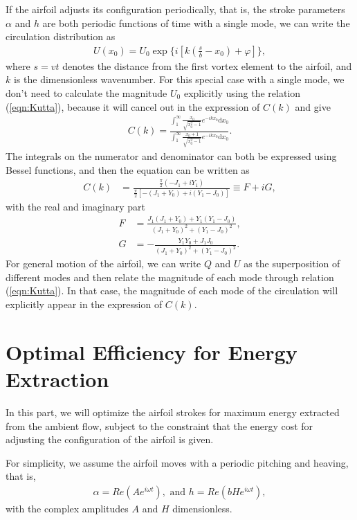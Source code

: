 If the airfoil adjusts its configuration periodically, that is, the stroke parameters $\alpha$ and $h$ are both periodic functions of time with a single mode, we can write the circulation distribution as
\begin{align}
U(x_0) = U_0 \exp \{i[k(\frac{s}{b}-x_0)+ \varphi] \},
\end{align}
where $s = vt$ denotes the distance from the first vortex element to the airfoil, and $k$ is the dimensionless wavenumber.
For this special case with a single mode, we don't need to calculate the magnitude $U_0$ explicitly using the relation (\ref{eqn:Kutta}), because it will cancel out in the expression of $C(k)$ and give
\begin{align}
C(k) = \frac{\int_{1}^{\infty} \frac{x_0}{\sqrt{x_0^2-1}} e^{-ikx_0} \mathrm{d}x_0}{\int_{1}^{\infty} \frac{x_0+1}{\sqrt{x_0^2-1}} e^{-ikx_0} \mathrm{d}x_0}.
\end{align}
The integrals on the numerator and denominator can both be expressed using Bessel functions, and then the equation can be written as
\begin{align}
C(k) & =  \frac{\frac{\pi}{2}(-J_1+iY_1)}{\frac{\pi}{2}[-(J_1+Y_0)+i(Y_1-J_0)]}
          \equiv  F+iG,
\end{align}
with the real and imaginary part
\begin{align}
F & = \frac{J_1(J_1+Y_0)+Y_1(Y_1-J_0)}{(J_1+Y_0)^2+(Y_1-J_0)^2},  \\
G & = -\frac{Y_1Y_0+J_1J_0}{(J_1+Y_0)^2+(Y_1-J_0)^2}.
\end{align}
For general motion of the airfoil, we can write $Q$  and $U$ as the superposition of different modes and then relate the magnitude of each mode through relation (\ref{eqn:Kutta}). In that case, the magnitude of each mode of the circulation will explicitly appear in the expression of $C(k)$.


\section{Optimal Efficiency for Energy Extraction}

In this part, we will optimize the airfoil strokes for maximum energy extracted from the ambient flow, subject to the constraint that the energy cost for adjusting the configuration of the airfoil is given.

For simplicity, we assume the airfoil moves with a periodic pitching and heaving, that is,
\begin{align}
\alpha = Re(A e^{i\omega t}),    \text{    and   }        h = Re(bH e^{i\omega t}),
\end{align}
with the complex amplitudes $A$ and $H$ dimensionless.

